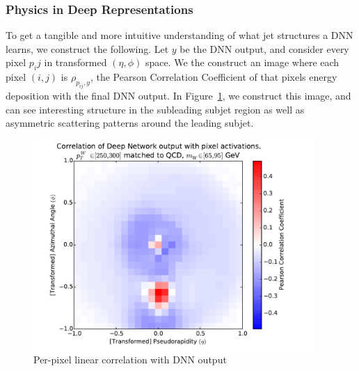 \subsubsection{Physics in Deep Representations} %
\label{ssub:physics_in_deep_representations}

To get a tangible and more intuitive understanding of what jet structures a DNN learns, we construct the following. Let $y$ be the DNN output, and consider every pixel $p_ij$ in transformed $(\eta, \phi)$ space. We the construct an image where each pixel $(i, j)$ is $\rho_{p_{ij}, y}$, the Pearson Correlation Coefficient of that pixels energy deposition with the final DNN output. In Figure~\ref{fig:corr}, we construct this image, and can see interesting structure in the subleading subjet region as well as asymmetric scattering patterns around the leading subjet.




\begin{figure}[!htbp]
  \centering
  \includegraphics[width=0.95\textwidth]{figures/pixel-activations-corr.pdf}
  \caption{Per-pixel linear correlation with DNN output}
  \label{fig:corr}
\end{figure}

